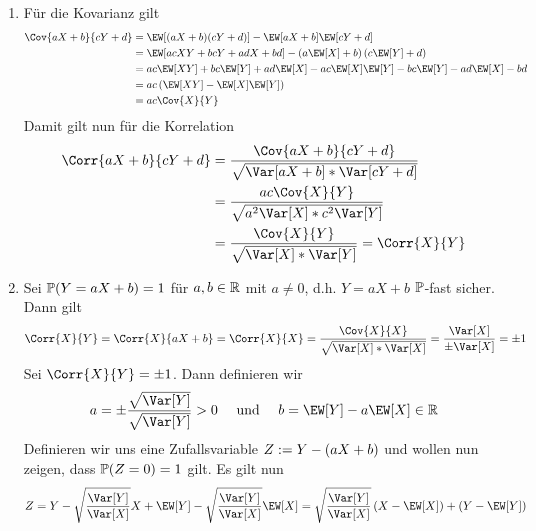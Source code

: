 \begin{exercisePage}
	\begin{enumerate}[label = (zu \alph*), leftmargin=*]
		\item Für die Kovarianz gilt
		\begin{equation*}
		\begin{aligned}
		\Cov{aX+b}{cY+d} &= \EW[(aX + b)(cY+d)] - \EW[aX+b] \EW[cY+d] \\
		&= \EW[ac XY + bc Y + ad X + bd] - \left( a \EW[X] + b \right) \left( c \EW[Y] + d \right) \\
		&= ac \EW[XY] + bc \EW[Y] + ad \EW[X]- ac \EW[X] \EW[Y] - bc \EW[Y] - ad \EW[X] - bd \\
		&= ac \left( \EW[XY] - \EW[X] \EW[Y] \right) \\
		&= ac \Cov{X}{Y}
		\end{aligned}
		\end{equation*}
		Damit gilt nun für die Korrelation
		\begin{equation*}
		\begin{aligned}
			\Corr{aX + b}{cY + d} 
			&= \frac{\Cov{aX+b}{cY+d}}{\sqrt{\Var[aX + b] * \Var[cY + d]}} \\
			&= \frac{ac \Cov{X}{Y}}{\sqrt{a^2 \Var[X] * c^2 \Var[Y]}} \\
			&= \frac{\Cov{X}{Y}}{\sqrt{\Var[X] * \Var[Y]}} = \Corr{X}{Y}
		\end{aligned}
		\end{equation*}
		\item \begin{proof-equivalence}
			\rueckrichtung Sei $\P(Y=aX+b) =1$ für $a,b \in \R$ mit $a \neq 0$, d.h. $Y = aX + b$ $\P$-fast sicher. Dann gilt
			\begin{equation*}
				\Corr{X}{Y} 
				= \Corr{X}{aX+b} 
				= \Corr{X}{X} 
				= \frac{\Cov{X}{X}}{\sqrt{\Var[X] * \Var[X]}} 
				= \frac{\Var[X]}{\pm \Var[X]} 
				= \pm 1
			\end{equation*}
			\hinrichtung Sei $\Corr{X}{Y} = \pm 1$. Dann definieren wir 
			\begin{equation*}
				a = \pm \frac{\sqrt{\Var[Y]}}{\sqrt{\Var[Y]}} > 0 
				\quad \und \quad 
				b = \EW[Y] - a \EW[X] \in \R
			\end{equation*}
			Definieren wir uns eine Zufallsvariable $Z \defeq Y - (a X + b)$ und wollen nun zeigen, dass $\P(Z = 0) = 1$ gilt. Es gilt nun
			\begin{equation*}
				Z = Y - \wurzel X + \EW[Y] - \wurzel \EW[X] = \wurzel \left( X - \EW[X] \right) + \left( Y - \EW[Y] \right)
			\end{equation*}

\end{proof-equivalence}
\end{enumerate}
\end{exercisePage}
